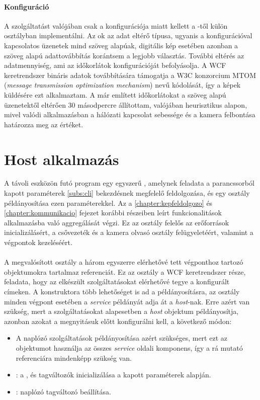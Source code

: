 \paragraph{Konfiguráció} 
A szolgáltatást valójában csak a konfigurációja miatt kellett a -től külön osztályban implementálni. Az ok az adat eltérő típusa, ugyanis a konfigurációval kapcsolatos üzenetek mind szöveg alapúak, digitális kép esetében azonban a szöveg alapú adattovábbítás korántsem a legjobb választás. További eltérés az adatmennyiség, ami az időkorlátok konfigurációját befolyásolja. A WCF keretrendszer bináris adatok továbbítására támogatja a W3C konzorcium MTOM (\emph{message transmission optimization mechanism}) nevű kódolását, így a képek küldésére ezt alkalmaztam. A már említett időkorlátokat a szöveg alapú üzenetektől eltérően 30 másodpercre állítottam, valójában heurisztikus alapon, mivel valódi alkalmazásban a hálózati kapcsolat sebessége és a kamera felbontása határozza meg az értéket.

\section{Host alkalmazás} \label{section:RpiRemoteHost}

A távoli eszközön futó program egy egyszerű , amelynek feladata a parancssorból kapott paraméterek \ref{subs:cli} bekezdésnek megfelelő feldolgozása, és egy  osztály példányosítása ezen paraméterekkel. Az  a \ref{chapter:kepfeldolgozo} és \ref{chapter:kommunikacio} fejezet korábbi részeiben leírt funkcionalitások alkalmazásba való aggregálását végzi. Ez az osztály felelős az erőforrások inicializálásért, a csővezeték és a kamera olvasó osztály felügyeletéért, valamint a végpontok kezeléséért.\\
\\
A megvalósított osztály a három egyszerre elérhetővé tett végponthoz tartozó  objektumokra tartalmaz referenciát. Ez az osztály a WCF keretrendszer része, feladata, hogy az elkészült szolgáltatásokat elérhetővé tegye a konfigurált címeken. A konstruktora több lehetőséget is ad a példányosításra, az  osztály minden végpont esetében a \emph{service} példányát adja át a \emph{host}-nak. Erre azért van szükség, mert a szolgáltatásokat alapesetben a \emph{host} objektum példányosítja, azonban azokat a megnyitásuk előtt konfigurálni kell, a következő módon:
\begin{itemize}
\item A naplózó szolgáltatások példányosítása azért szükséges, mert ezt az objektumot használja az összes \emph{service} oldali komponens, így a rá mutató referenciára mindenképp szükség van.
\item {}: a ,  és  tagváltozók inicializálása a kapott paraméterek alapján.
\item {}: naplózó tagváltozó beállítása.
\end{itemize}

